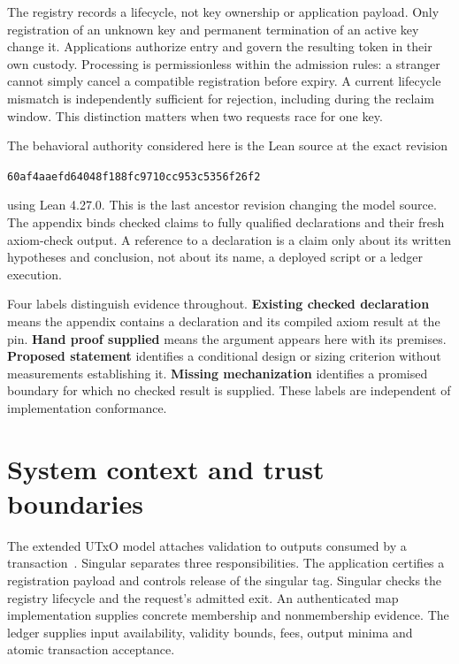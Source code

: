 \documentclass[runningheads]{llncs}
\newcommand{\modelpin}{60af4aaefd64048f188fc9710cc953c5356f26f2}
\begin{document}
The registry records a lifecycle, not key ownership or application payload.
Only registration of an unknown key and permanent termination of an active key
change it. Applications authorize entry and govern the resulting token in their
own custody. Processing is permissionless within the admission rules: a stranger
cannot simply cancel a compatible registration before expiry. A current
lifecycle mismatch is independently sufficient for rejection, including during
the reclaim window. This distinction matters when two requests race for one key.

The behavioral authority considered here is the Lean source at the exact revision
\begin{center}\small\texttt{\modelpin}\end{center}
using Lean 4.27.0. This is the last ancestor revision changing the model source.
The appendix binds checked claims to fully qualified declarations and their
fresh axiom-check output. A reference to a declaration is a claim only about its
written hypotheses and conclusion, not about its name, a deployed script or a
ledger execution.

Four labels distinguish evidence throughout. \textbf{Existing checked declaration}
means the appendix contains a declaration and its compiled axiom result at the
pin. \textbf{Hand proof supplied} means the argument appears here with its
premises. \textbf{Proposed statement} identifies a conditional design or sizing
criterion without measurements establishing it. \textbf{Missing mechanization}
identifies a promised boundary for which no checked result is supplied. These
labels are independent of implementation conformance.



\section{System context and trust boundaries}
The extended UTxO model attaches validation to outputs consumed by a
transaction~\cite{ExtendedUTXO20}. Singular separates three responsibilities.
The application certifies a registration payload and controls release of the
singular tag. Singular checks the registry lifecycle and the request's admitted
exit. An authenticated map implementation supplies concrete membership and
nonmembership evidence. The ledger supplies input availability, validity bounds,
fees, output minima and atomic transaction acceptance.
\end{document}
